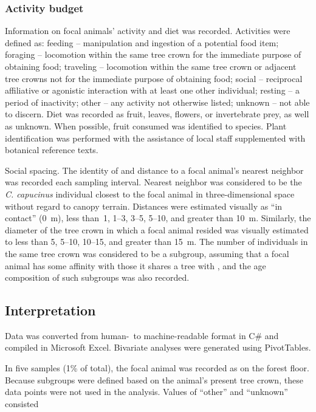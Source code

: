 \documentclass{../../../coursework}
\begin{document}
\subsubsection{Activity budget}

Information on focal animals' activity and diet was recorded. Activities were
defined as: feeding -- manipulation and ingestion of a potential food item;
foraging -- locomotion within the same tree crown for the immediate purpose of
obtaining food; traveling -- locomotion within the same tree crown or adjacent
tree crowns not for the immediate purpose of obtaining food; social --
reciprocal affiliative or agonistic interaction with at least one other
individual; resting -- a period of inactivity; other -- any activity not
otherwise listed; unknown -- not able to discern. Diet was recorded as fruit,
leaves, flowers, or invertebrate prey, as well as unknown. When possible,
fruit consumed was identified to species. Plant identification was performed
with the assistance of local staff supplemented with botanical reference texts.

Social spacing. The identity of and distance to a focal animal's nearest
neighbor was recorded each sampling interval. Nearest neighbor was considered
to be the \emph{C. capucinus} individual closest to the focal animal in
three-dimensional space without regard to canopy terrain. Distances were
estimated visually as ``in contact'' (\SI{0}{\metre}), less than~1,
\numrange{1}{3}, \numrange{3}{5}, \numrange{5}{10}, and greater than
\SI{10}{\metre}. Similarly, the diameter of the tree crown in which a focal
animal resided was visually estimated to less than 5, \numrange{5}{10},
\numrange{10}{15}, and greater than \SI{15}{\metre}. The number of individuals
in the same tree crown was considered to be a subgroup, assuming that a focal
animal has some affinity with those it shares a tree with
\parencite{Bezanson2008}, and the age composition of such subgroups was also
recorded.

\subsection{Interpretation}

Data was converted from human-\ to machine-readable format in C\# and compiled
in Microsoft Excel. Bivariate analyses were generated using PivotTables.

In five samples (1\% of total), the focal animal was recorded as on the forest
floor. Because subgroups were defined based on the animal's present tree crown,
these data points were not used in the analysis. Values of ``other'' and
``unknown'' consisted
\end{document}
